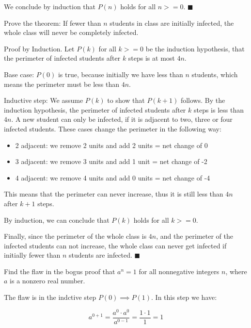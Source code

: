 \documentclass[../main.tex]{subfiles}
\begin{document}
\begin{questions}
\begin{solution}
  We conclude by induction that $P(n)$ holds for all $n >= 0$. $\blacksquare$
\end{solution}

\question Prove the theorem: If fewer than $n$ students in class are initially infected, the whole class will never be completely infected.
\begin{solution}
  Proof by Induction. Let $P(k)$ for all $k >= 0$ be the induction hypothesis, that the perimeter of infected students after $k$ steps is at most $4n$.

  Base case: $P(0)$ is true, because initially we have less than $n$ students, which means the perimeter must be less than $4n$.

  Inductive step: We assume $P(k)$ to show that $P(k+1)$ follows. By the induction hypothesis, the perimeter of infected students after $k$ steps is less than $4n$. A new student can only be infected, if it is adjacent to two, three or four infected students. These cases change the perimeter in the following way:

  \begin{itemize}
    \item 2 adjacent: we remove 2 units and add 2 units = net change of 0
    \item 3 adjacent: we remove 3 units and add 1 unit = net change of -2
    \item 4 adjacent: we remove 4 units and add 0 units = net change of -4
  \end{itemize}
  This means that the perimeter can never increase, thus it is still less than $4n$ after $k+1$ steps.

  By induction, we can conclude that $P(k)$ holds for all $k >= 0$.

  Finally, since the perimeter of the whole class is $4n$, and the perimeter of the infected students can not increase, the whole class can never get infected if initially fewer than $n$ students are infected. $\blacksquare$
\end{solution}

\question Find the flaw in the bogus proof that $a^n=1$ for all nonnegative integers $n$, where $a$ is a nonzero real number.

\begin{solution}

  The flaw is in the indctive step $P(0) \implies P(1)$. In this step we have:

  $$
  a^{0+1}=\frac{a^0 \cdot a^0}{a^{0-1}} = \frac{1 \cdot 1}{1} = 1
  $$


\end{solution}
\end{questions}
\end{document}
